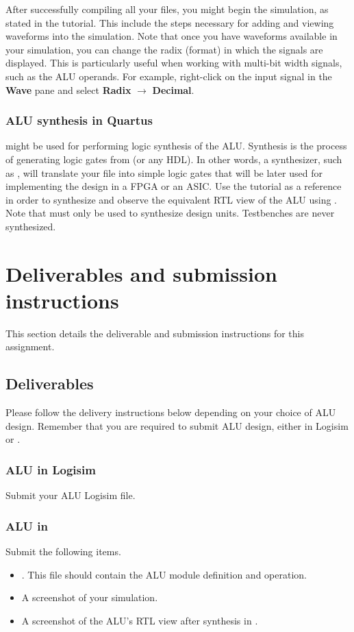 \documentclass[number=03]{assignment}
\newcommand{\alusvfile}{\colorfilename{alu.sv}}
\begin{document}
After successfully compiling all your \SV files, you might begin the simulation, as stated in the tutorial.
This include the steps necessary for adding and viewing waveforms into the simulation.
Note that once you have waveforms available in your simulation, you can change the radix (format) in which the signals are displayed. 
This is particularly useful when working with multi-bit width signals, such as the \ac{ALU} operands. 
For example, right-click on the input signal  in the \textbf{Wave} pane and select \textbf{Radix} $\rightarrow$ \textbf{Decimal}.

\subsubsection{ALU synthesis in Quartus}
\Quartus might be used for performing logic synthesis of the \ac{ALU}.
Synthesis is the process of generating logic gates from \SV (or any \ac{HDL}).
In other words, a synthesizer, such as \Quartus, will translate your \SV file into simple logic gates that will be later used for implementing the design in a \ac{FPGA} or an \ac{ASIC}.
Use the tutorial as a reference in order to synthesize and observe the equivalent \ac{RTL} view of the \ac{ALU} using \Quartus.
Note that \Quartus must only be used to synthesize design units.
Testbenches are never synthesized.

\newpage
\section{Deliverables and submission instructions}\label{Sec:Deliverables}
This section details the deliverable and submission instructions for this assignment.

\subsection{Deliverables}
Please follow the delivery instructions below depending on your choice of \ac{ALU} design.
Remember that you are required to submit  \ac{ALU} design, either in Logisim or \SV.

\subsubsection{ALU in Logisim}
Submit your \ac{ALU}  Logisim file. 

\subsubsection{ALU in \SV}
Submit the following items.
\begin{itemize}
\item \alusvfile. This file should contain the \ac{ALU} module definition and operation.
\item A screenshot of your \ModelSim simulation.
\item A screenshot of the \ac{ALU}'s \ac{RTL} view after synthesis in \Quartus.
\end{itemize}
\end{document}
